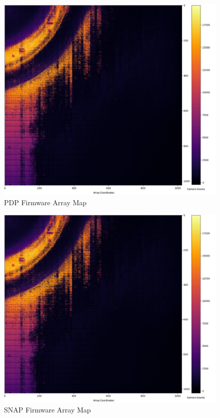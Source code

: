             \begin{figure}[t]
                \centering
                \includegraphics[width=1.0\textwidth]{fig/array_map_pdp.jpg}
                \caption{PDP Firmware Array Map}
                \label{fig:array_map_pdp}
            \end{figure}

            \begin{figure}[t]
                \centering
                \includegraphics[width=1.0\textwidth]{fig/array_map_snap.jpg}
                \caption{SNAP Firmware Array Map}
                \label{fig:array_map_snap}
            \end{figure}

